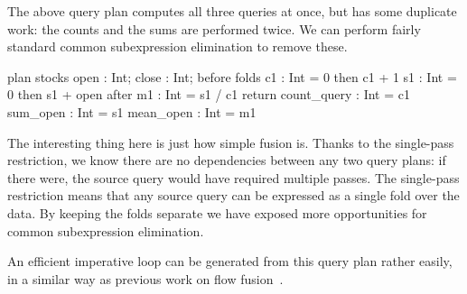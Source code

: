 The above query plan computes all three queries at once, but has some duplicate work: the counts and the sums are performed twice.
We can perform fairly standard common subexpression elimination to remove these.
\begin{code}
    plan stocks { open : Int; close : Int; }
    before { }
    folds  { c1 : Int = 0 then c1 + 1
             s1 : Int = 0 then s1 + open }
    after  { m1 : Int = s1 / c1 }
    return { count_query : Int = c1
             sum_open    : Int = s1
             mean_open   : Int = m1 }
\end{code}

The interesting thing here is just how simple fusion is.
Thanks to the single-pass restriction, we know there are no dependencies between any two query plans: if there were, the source query would have required multiple passes.
The single-pass restriction means that any source query can be expressed as a single fold over the data.
By keeping the folds separate we have exposed more opportunities for common subexpression elimination.

An efficient imperative loop can be generated from this query plan rather easily, in a similar way as previous work on flow fusion~\cite{lippmeier2013data}.

